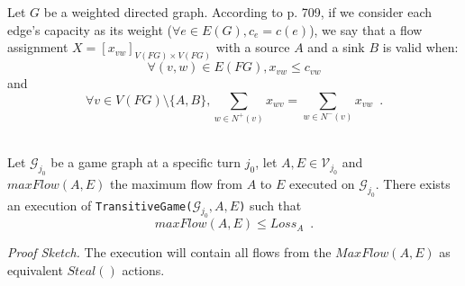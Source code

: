 \documentclass[11pt]{llncs}
\newenvironment{proofsketch}{\textit{Proof Sketch.}}{}
\begin{document}
    Let $G$ be a weighted directed graph. According to \cite{clrs} p. 709, if we consider each edge's capacity as its weight
    ($\forall e \in E(G), c_e = c(e)$), we say that a flow assignment $X = [x_{vw}]_{V(FG) \times V(FG)}$ with a source $A$
    and a sink $B$ is valid when:
    \begin{equation}
    \label{flow1}
       \forall (v, w) \in E(FG), x_{vw} \leq c_{vw}
    \end{equation}
    and
    \begin{equation}
    \label{flow2}
       \forall v \in V(FG) \setminus \{A,B\}, \sum\limits_{w \in N^{+}(v)}x_{wv} = \sum\limits_{w \in N^{-}(v)}x_{vw}
       \enspace.
    \end{equation}
    \begin{lemma} \ \\
       \label{maxflowgame}
       Let $\mathcal{G}_{j_0}$ be a game graph at a specific turn $j_0$, let $A, E \in \mathcal{V}_{j_0}$ and
       $maxFlow\left(A, E\right)$ the maximum flow from $A$ to $E$ executed on $\mathcal{G}_{j_0}$. There exists an execution
       of \texttt{TransitiveGame(}$\mathcal{G}_{j_0}, A, E$\texttt{)} such that
       \begin{equation}
          maxFlow\left(A, E\right) \leq Loss_A \enspace.
       \end{equation}
    \end{lemma}
    \begin{proofsketch}
       The execution will contain all flows from the $MaxFlow\left(A, E\right)$ as equivalent $Steal\left(\right)$ actions.
    \end{proofsketch}
\end{document}
